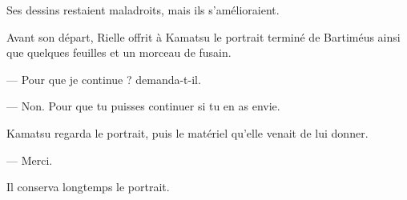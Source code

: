 Ses dessins restaient maladroits, mais ils s'amélioraient.

Avant son départ, Rielle offrit à Kamatsu le portrait terminé de Bartiméus
ainsi que quelques feuilles et un morceau de fusain.

— Pour que je continue ? demanda-t-il.

— Non. Pour que tu puisses continuer si tu en as envie.

Kamatsu regarda le portrait, puis le matériel qu'elle venait de lui donner.

— Merci.

Il conserva longtemps le portrait.